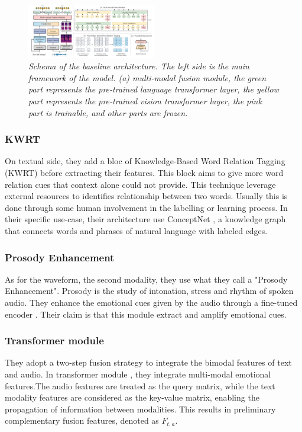 \documentclass{article}
\begin{document}
\begin{figure}[htbp]
  \centering
  \includegraphics[width=0.5\textwidth]{Images/EPCFusion_BaselineArchitecture.png}
  \caption{\textit{Schema of the baseline architecture. The left side is the main framework of the model. (a) multi-modal fusion module, the green part represents the pre-trained
language transformer layer, the yellow part represents the pre-trained vision transformer layer, the pink part is trainable, and other
parts are frozen.}}
  \label{fig:BaselineArchitecture}
\end{figure}

\subsubsection{KWRT}
On textual side, they add a bloc of Knowledge-Based Word Relation Tagging (KWRT) before extracting their features. This block aims to give more word relation cues that context alone could not provide. This technique leverage external resources to identifies relationship between two words. Usually this is done through some human involvement in the labelling or learning process. In their specific use-case, their architecture use ConceptNet \cite{speer2018conceptnet}, a knowledge graph that connects words and phrases of natural language with labeled edges.

\subsubsection{Prosody Enhancement}
As for the waveform, the second modality, they use what they call a "Prosody Enhancement". Prosody is the study of intonation, stress and rhythm of spoken audio. They enhance the emotional cues given by the audio through a fine-tuned encoder \cite{yang2022speech}. Their claim is that this module extract and amplify emotional cues.


\subsubsection{Transformer module}
They adopt a two-step fusion strategy to integrate the bimodal features of text and audio. In transformer module , they integrate multi-modal emotional features.The audio features are treated as the query matrix, while the text modality features are considered as the key-value matrix, enabling the propagation of information between modalities. This results in preliminary complementary fusion features, denoted as $F_{t,a}$.
\end{document}
